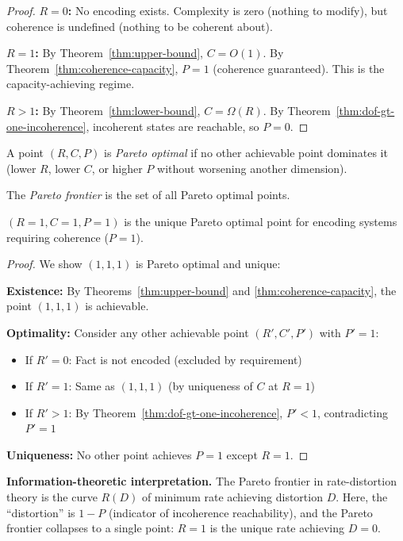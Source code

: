 \begin{proof}
\textbf{$R = 0$:} No encoding exists. Complexity is zero (nothing to modify), but coherence is undefined (nothing to be coherent about).

\textbf{$R = 1$:} By Theorem~\ref{thm:upper-bound}, $C = O(1)$. By Theorem~\ref{thm:coherence-capacity}, $P = 1$ (coherence guaranteed). This is the capacity-achieving regime.

\textbf{$R > 1$:} By Theorem~\ref{thm:lower-bound}, $C = \Omega(R)$. By Theorem~\ref{thm:dof-gt-one-incoherence}, incoherent states are reachable, so $P = 0$.
\end{proof}

\begin{definition}\label{def:pareto-frontier}
A point $(R, C, P)$ is \emph{Pareto optimal} if no other achievable point dominates it (lower $R$, lower $C$, or higher $P$ without worsening another dimension).

The \emph{Pareto frontier} is the set of all Pareto optimal points.
\end{definition}

\begin{theorem}[Pareto Optimality of DOF = 1]\label{thm:pareto-optimal}
$(R=1, C=1, P=1)$ is the unique Pareto optimal point for encoding systems requiring coherence ($P = 1$).
\end{theorem}

\begin{proof}
We show $(1, 1, 1)$ is Pareto optimal and unique:

\textbf{Existence:} By Theorems~\ref{thm:upper-bound} and \ref{thm:coherence-capacity}, the point $(1, 1, 1)$ is achievable.

\textbf{Optimality:} Consider any other achievable point $(R', C', P')$ with $P' = 1$:
\begin{itemize}
\tightlist
\item If $R' = 0$: Fact is not encoded (excluded by requirement)
\item If $R' = 1$: Same as $(1, 1, 1)$ (by uniqueness of $C$ at $R=1$)
\item If $R' > 1$: By Theorem~\ref{thm:dof-gt-one-incoherence}, $P' < 1$, contradicting $P' = 1$
\end{itemize}

\textbf{Uniqueness:} No other point achieves $P = 1$ except $R = 1$.
\end{proof}

\textbf{Information-theoretic interpretation.} The Pareto frontier in rate-distortion theory is the curve $R(D)$ of minimum rate achieving distortion $D$. Here, the ``distortion'' is $1 - P$ (indicator of incoherence reachability), and the Pareto frontier collapses to a single point: $R = 1$ is the unique rate achieving $D = 0$.

